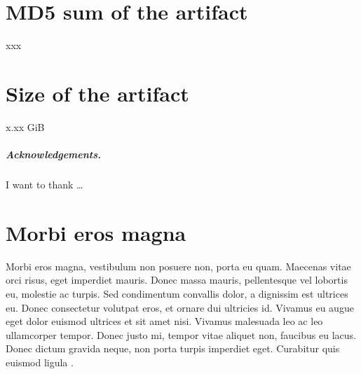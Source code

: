 \documentclass[a4paper,UKenglish]{darts-v2018}
\newcommand{\mdsum}[1]{{\section{MD5 sum of the artifact}#1}}
\newcommand{\artifactsize}[1]{{\section{Size of the artifact}#1}}
\begin{document}
\mdsum{xxx}

\artifactsize{x.xx GiB}

\subparagraph*{Acknowledgements.}

I want to thank \dots

\appendix
\section{Morbi eros magna}

Morbi eros magna, vestibulum non posuere non, porta eu quam. Maecenas vitae orci risus, eget imperdiet mauris. Donec massa mauris, pellentesque vel lobortis eu, molestie ac turpis. Sed condimentum convallis dolor, a dignissim est ultrices eu. Donec consectetur volutpat eros, et ornare dui ultricies id. Vivamus eu augue eget dolor euismod ultrices et sit amet nisi. Vivamus malesuada leo ac leo ullamcorper tempor. Donec justo mi, tempor vitae aliquet non, faucibus eu lacus. Donec dictum gravida neque, non porta turpis imperdiet eget. Curabitur quis euismod ligula \cite{DBLP:books/mk/GrayR93,DBLP:conf/focs/FOCS16,DBLP:conf/focs/HopcroftPV75,DBLP:journals/cacm/Dijkstra68a,DBLP:journals/cacm/Knuth74}. 







\end{document}
